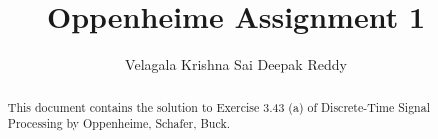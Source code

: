 \documentclass[journal,12pt,twocolumn]{IEEEtran}
\renewcommand\thesection{\arabic{section}}
\begin{document}


\title{Oppenheime Assignment 1}
\author{Velagala Krishna Sai Deepak Reddy}
\maketitle
\bigskip


\begin{abstract}
     This document contains the solution to Exercise 3.43 (a) of Discrete-Time Signal Processing by Oppenheime, Schafer, Buck.
\end{abstract}
\end{document}
